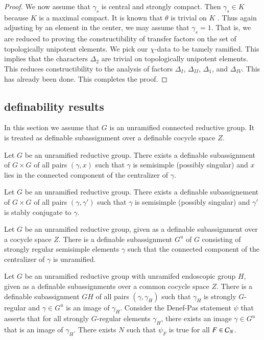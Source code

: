 \begin{proof}
We now assume that $\gamma_s$ is central and strongly compact.  Then $\gamma_s\in K$ because $K$ is a maximal compact.
It is known that $\theta$ is trivial on $K$ \cite[Lemma 3.2]{hales1995fundamental}. Thus again adjusting by an element in the center,
we may assume that $\gamma_s=1$.  That is, we are reduced to proving the constructibility of transfer factors on the set of topologically
unipotent elements.  We pick our $\chi$-data to be tamely ramified.  This implies that the characters $\Delta_2$ are trivial
on topologically unipotent elements.  This reduces constructibility to the analysis of factors $\Delta_I$, $\Delta_{II}$, $\Delta_1$, and $\Delta_{IV}$.
This has already been done.  This completes the proof.
\end{proof}

\subsection{definability results}\label{sec:definability}

In this section we assume that $G$ is an unramified connected reductive group.  It is treated  as definable subassignment
over a definable cocycle space $Z$.

\begin{lemma}  Let $G$ be an unramified reductive group.  There exists a definable subassignment of $G\times G$ of all pairs
$(\gamma,x)$ such that $\gamma$ is semisimple (possibly singular) and $x$ lies in the connected component of the centralizer of $\gamma$.
\end{lemma}

\begin{lemma} Let $G$ be an unramified reductive group.  There exists a definable subassignement of $G\times G$ of all pairs
$(\gamma,\gamma')$ such that $\gamma$ is semisimple (possibly singular) and $\gamma'$ is stably conjugate to $\gamma$.
\end{lemma}

\begin{lemma} Let $G$ be an unramified reductive group, given as a definable subassignment over a cocycle space $Z$.
There is a definable subassignment $G^u$ of $G$ consisting of strongly regular semisimple elements $\gamma$ such that
the connected component of the centralizer of $\gamma$ is unramified. 
\end{lemma}

\begin{lemma} Let $G$ be an unramified reductive group with unramifed endoscopic group $H$, given as a definable subassignments over a common cocycle space $Z$.
There is a definable subassignment $GH$ of all pairs $(\gamma,\gamma_H)$ such that $\gamma_H$ is strongly $G$-regular and $\gamma\in G^u$ is an image of $\gamma_H$.
Consider the Denef-Pas statement $\psi$ that asserts that for all strongly $G$-regular elements $\gamma_H$, there exists an image $\gamma\in G^u$ that is an image of $\gamma_H$.
There exists $N$ such that $\psi_F$ is true for all $F\in\mathcal C_N$.
\end{lemma}

